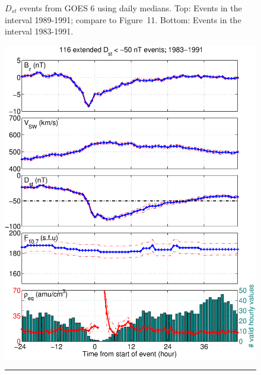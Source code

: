 \documentclass[12pt]{article}
\begin{document}
\begin{figure}[h]
\caption{$D_{st}$ events from GOES 6 using daily medians. Top: Events in the interval 1989-1991; compare to \cite{Takahashi2010} Figure~11. Bottom: Events in the interval 1983-1991.}
\label{fig:DailyAveragedDstEvents}
\end{figure}

\clearpage

\begin{figure}[tp!]
\centering
\includegraphics[scale=0.40]{UsedFigures/2016SW001507R-p04a.eps}
\\
\rule[1ex]{5cm}{1pt}
\\

\end{figure}
\end{document}
